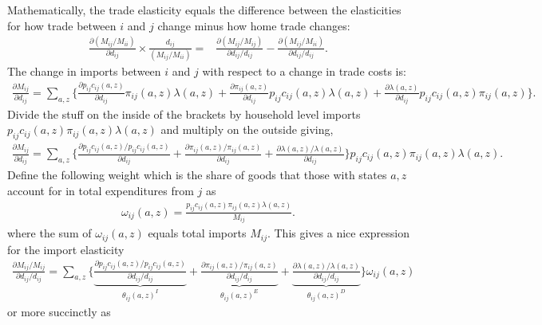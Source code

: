 \documentclass[12pt,pdftex]{article}
\begin{document}
\begin{onehalfspacing}
Mathematically, the trade elasticity equals the difference between the elasticities for how trade between $i$ and $j$ change minus how home trade changes:
\begin{align}
\frac{\partial ( M_{ij} / M_{ii} )}{\partial d_{ij}} \times \frac{d_{ij}}{( M_{ij} / M_{ii} )} =& \frac{\partial ( M_{ij} / M_{ij} )}{\partial d_{ij} / d_{ij}}  - \frac{\partial ( M_{ij} / M_{ii} )}{\partial d_{ij} / d_{ij}}.
\label{eq:def_trade_elasticity}
\end{align}
The change in imports between $i$ and $j$ with respect to a change in trade costs is:
\begin{align}
\frac{\partial  M_{ij}}{\partial d_{ij}} = \sum_{a,z} \bigg \{ \frac{\partial p_{ij}c_{ij}(a,z)}{\partial d_{ij}} \pi_{ij}(a,z)\lambda(a,z) +
 \frac{\partial \pi_{ij}(a,z)}{\partial d_{ij}} p_{ij}c_{ij}(a,z)\lambda(a,z)  +
\frac{\partial \lambda(a,z)}{\partial d_{ij}} p_{ij}c_{ij}(a,z)\pi_{ij}(a,z) \bigg \}.
\end{align}
Divide the stuff on the inside of the brackets by household level imports $p_{ij}c_{ij}(a,z)\pi_{ij}(a,z) \lambda(a,z)$ and multiply on the outside giving,
\begin{align}
\frac{\partial  M_{ij}}{\partial d_{ij}} = \sum_{a,z} \bigg \{ \frac{\partial p_{ij}c_{ij}(a,z)/ p_{ij}c_{ij}(a,z)}{\partial d_{ij}} +
 \frac{\partial \pi_{ij}(a,z) / \pi_{ij}(a,z)}{\partial d_{ij}}  +
\frac{\partial \lambda(a,z) / \lambda(a,z)}{\partial d_{ij}} \bigg \} p_{ij}c_{ij}(a,z)\pi_{ij}(a,z) \lambda(a,z).
\end{align}
Define the following weight which is the share of goods that those with states $a,z$ account for in total expenditures from $j$ as
\begin{align}
\omega_{ij}(a,z) = \frac{p_{ij}c_{ij}(a,z)\pi_{ij}(a,z) \lambda(a,z)}{M_{ij}}.
\end{align}
where the sum of $\omega_{ij}(a,z)$ equals total imports $M_{ij}$. This gives a nice expression for the import elasticity
\begin{align}
\frac{\partial  M_{ij} / M_{ij}}{\partial d_{ij} / d_{ij}} = \sum_{a,z} \bigg \{ \underbrace{ \frac{\partial p_{ij}c_{ij}(a,z)/ p_{ij}c_{ij}(a,z)}{\partial d_{ij} / d_{ij}} }_{\theta_{ij}(a,z)^{I}}+
\underbrace{\frac{\partial \pi_{ij}(a,z) / \pi_{ij}(a,z)}{\partial d_{ij} / d_{ij}} }_{\theta_{ij}(a,z)^{E}} +
\underbrace{\frac{\partial \lambda(a,z) / \lambda(a,z)}{\partial d_{ij} / d_{ij}}}_{\theta_{ij}(a,z)^{D}} \bigg \} \omega_{ij}(a,z)
\end{align}
or more succinctly as

\end{onehalfspacing}
\end{document}
